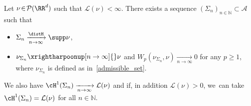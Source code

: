 \begin{lemma}
\label{lemma.approximation_lemma}
Let $\nu \!\in\! \mathcal{P}(\RR^d)$ such that $\mathcal{L}(\nu) \!<\! \infty$. There exists a sequence $\left(\Sigma_n\right)_{n \in \mathbb{N}} \!\subset\! \mathcal{A}$ such that
\begin{itemize}
\item $\Sigma_n \xrightarrow[n \to \infty]{\distH} \supp \nu$,
\item $\nu_{\Sigma_n} \xrightharpoonup[n \to \infty]{} \nu$ and $W_p(\nu_{\Sigma_n}, \nu) \xrightarrow[n \to \infty]{} 0$ for any $p \ge 1$, where $\nu_{\Sigma_n}$ is defined as in~\eqref{admissible_set}.
\end{itemize}
We also have $\cH^1(\Sigma_n) \xrightarrow[n \to \infty]{} \mathcal{L}(\nu)$ and if, in addition $\mathcal{L}(\nu) > 0$, we~can take $\cH^1(\Sigma_n) = \mathcal{L}(\nu)$ for all $n \in \mathbb{N}$.
\end{lemma}

